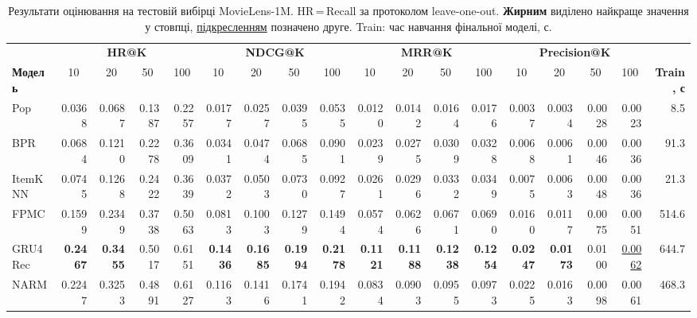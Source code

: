\documentclass[12pt,a4paper]{article}
\newcommand{\best}[1]{\textbf{#1}}
\newcommand{\second}[1]{\underline{#1}}
\begin{document}
\begin{table}
\centering
\scriptsize
\setlength{\tabcolsep}{3.8pt}
\caption{Результати оцінювання на тестовій вибірці MovieLens-1M.
         HR\,=\,Recall за протоколом leave-one-out.
         \best{Жирним} виділено найкраще значення у стовпці,
         \underline{підкресленням} позначено друге.
         Train: час навчання фінальної моделі, с.}
\label{tab:results}
\begin{tabular}{l|rrrr|rrrr|rrrr|rrrr|r}
\toprule
& \multicolumn{4}{c|}{\textbf{HR@K}}
& \multicolumn{4}{c|}{\textbf{NDCG@K}}
& \multicolumn{4}{c|}{\textbf{MRR@K}}
& \multicolumn{4}{c|}{\textbf{Precision@K}}
& \\
\textbf{Модель}
  & \multicolumn{1}{c}{10}
  & \multicolumn{1}{c}{20}
  & \multicolumn{1}{c}{50}
  & \multicolumn{1}{c|}{100}
  & \multicolumn{1}{c}{10}
  & \multicolumn{1}{c}{20}
  & \multicolumn{1}{c}{50}
  & \multicolumn{1}{c|}{100}
  & \multicolumn{1}{c}{10}
  & \multicolumn{1}{c}{20}
  & \multicolumn{1}{c}{50}
  & \multicolumn{1}{c|}{100}
  & \multicolumn{1}{c}{10}
  & \multicolumn{1}{c}{20}
  & \multicolumn{1}{c}{50}
  & \multicolumn{1}{c|}{100}
  & \textbf{Train, с} \\
\midrule
Pop
  & 0.0368 & 0.0687 & 0.1387 & 0.2257
  & 0.0177 & 0.0257 & 0.0395 & 0.0535
  & 0.0120 & 0.0142 & 0.0164 & 0.0176
  & 0.0037 & 0.0034 & 0.0028 & 0.0023
  & 8.5 \\
BPR
  & 0.0684 & 0.1210 & 0.2278 & 0.3609
  & 0.0341 & 0.0474 & 0.0685 & 0.0901
  & 0.0239 & 0.0275 & 0.0309 & 0.0328
  & 0.0068 & 0.0061 & 0.0046 & 0.0036
  & 91.3 \\
ItemKNN
  & 0.0745 & 0.1268 & 0.2422 & 0.3639
  & 0.0372 & 0.0503 & 0.0730 & 0.0927
  & 0.0261 & 0.0296 & 0.0332 & 0.0349
  & 0.0075 & 0.0063 & 0.0048 & 0.0036
  & 21.3 \\
\midrule
FPMC
  & 0.1599 & 0.2349 & 0.3738 & 0.5063
  & 0.0813 & 0.1003 & 0.1279 & 0.1494
  & 0.0574 & 0.0626 & 0.0671 & 0.0690
  & 0.0160 & 0.0117 & 0.0075 & 0.0051
  & 514.6 \\
GRU4Rec
  & \best{0.2467} & \best{0.3455} & 0.5017 & 0.6151
  & \best{0.1436} & \best{0.1685} & \best{0.1994} & \best{0.2178}
  & \best{0.1121} & \best{0.1188} & \best{0.1238} & \best{0.1254}
  & \best{0.0247} & \best{0.0173} & 0.0100 & \second{0.0062}
  & 644.7 \\
NARM
  & 0.2247 & 0.3253 & 0.4891 & 0.6127
  & 0.1163 & 0.1416 & 0.1741 & 0.1942
  & 0.0834 & 0.0903 & 0.0955 & 0.0973
  & 0.0225 & 0.0163 & 0.0098 & 0.0061
  & 468.3 \\

\end{tabular}
\end{table}
\end{document}
